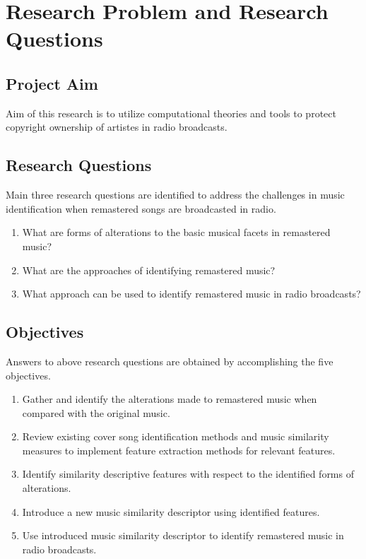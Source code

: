 \section{Research Problem and Research Questions}

\subsection{Project Aim}


Aim of this research is to utilize computational theories and tools to protect copyright ownership of artistes in radio broadcasts.


\subsection{Research Questions}

Main three research questions are identified to address the challenges in music identification when
remastered songs are broadcasted in radio. 

\begin{enumerate}
    \item What are forms of alterations to the basic musical facets in remastered music?
    \item What are the approaches of identifying remastered music?
    \item What approach can be used to identify remastered music in radio broadcasts?    
\end{enumerate}

\subsection{Objectives}

Answers to above research questions are obtained by accomplishing the five objectives. 

\begin{enumerate}
    \item Gather and identify the alterations made to remastered music when compared with the original music.
    \item Review existing cover song identification methods and music similarity measures to implement feature extraction methods for relevant features.
    \item Identify similarity descriptive features with respect to the identified forms of alterations.
    \item Introduce a new  music similarity descriptor using identified features.
    \item Use introduced music similarity descriptor to identify remastered music in radio broadcasts.      
\end{enumerate}







